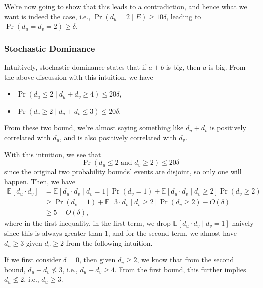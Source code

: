 We're now going to show that this leads to a contradiction, and hence what we want is indeed the case, i.e., \(\Pr(d_u = 2 \mid E) \geq 10 \delta\), leading to \(\Pr(d_u = d_v = 2) \geq \delta\).
\subsubsection{Stochastic Dominance}\label{subsub:stochastic-dominance}
Intuitively, stochastic dominance states that if \(a+b\) is big, then \(a\) is big. From the above discussion with this intuition, we have
\begin{itemize}
	\item \(\Pr(d_u \leq 2 \mid d_u + d_v \geq 4) \leq 20\delta \),
	\item \(\Pr(d_v \geq 2 \mid d_u + d_v \leq 3) \leq 20\delta \).
\end{itemize}

\begin{note}
	From these two bound, we're almost saying something like \(d_u + d_v\) is positively correlated with \(d_u\), and is also positively correlated with \(d_v\).
\end{note}

With this intuition, we see that
\[
	\Pr(d_u \leq 2 \text{ and }d_v \geq 2 ) \leq 20 \delta
\]
since the original two probability bounds' events are disjoint, so only one will happen. Then, we have
\begin{equation}\label{eq:lec13-1}
	\begin{split}
		\mathbb{E}_{}\left[d_u \cdot d_v \right]
		&= \mathbb{E}_{}\left[d_u \cdot d_v \mid d_v = 1 \right] \Pr(d_v = 1) + \mathbb{E}_{}\left[d_u \cdot d_v \mid d_v \geq 2 \right] \Pr(d_v \geq 2)\\
		&\geq \Pr(d_v = 1) +  \mathbb{E}_{}\left[3\cdot d_v \mid d_v \geq 2 \right] \Pr(d_v \geq 2) - O(\delta )\\
		&\geq 5 - O(\delta ),
	\end{split}
\end{equation}
where in the first inequality, in the first term, we drop \(\mathbb{E}_{}\left[d_u\cdot d_v \mid d_v = 1\right]\) naively since this is always greater than \(1\), and for the second term, we almost have \(d_u \geq 3\) given \(d_v \geq 2\) from the following intuition.

\begin{intuition}
	If we first consider \(\delta = 0\), then given \(d_v \geq 2\), we know that from the second bound, \(d_u + d_v \nleq 3\), i.e., \(d_u + d_v \geq 4\). From the first bound, this further implies \(d_u \nleq 2\), i.e., \(d_u \geq 3\).
\end{intuition}

